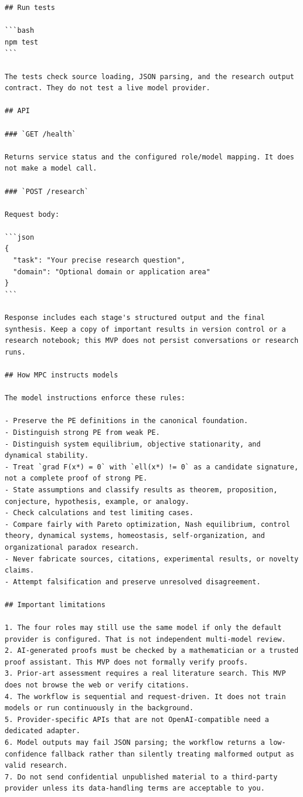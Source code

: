 \documentclass[10pt,a4paper]{article}
\begin{document}
\begin{lstlisting}
## Run tests

```bash
npm test
```

The tests check source loading, JSON parsing, and the research output contract. They do not test a live model provider.

## API

### `GET /health`

Returns service status and the configured role/model mapping. It does not make a model call.

### `POST /research`

Request body:

```json
{
  "task": "Your precise research question",
  "domain": "Optional domain or application area"
}
```

Response includes each stage's structured output and the final synthesis. Keep a copy of important results in version control or a research notebook; this MVP does not persist conversations or research runs.

## How MPC instructs models

The model instructions enforce these rules:

- Preserve the PE definitions in the canonical foundation.
- Distinguish strong PE from weak PE.
- Distinguish system equilibrium, objective stationarity, and dynamical stability.
- Treat `grad F(x*) = 0` with `ell(x*) != 0` as a candidate signature, not a complete proof of strong PE.
- State assumptions and classify results as theorem, proposition, conjecture, hypothesis, example, or analogy.
- Check calculations and test limiting cases.
- Compare fairly with Pareto optimization, Nash equilibrium, control theory, dynamical systems, homeostasis, self-organization, and organizational paradox research.
- Never fabricate sources, citations, experimental results, or novelty claims.
- Attempt falsification and preserve unresolved disagreement.

## Important limitations

1. The four roles may still use the same model if only the default provider is configured. That is not independent multi-model review.
2. AI-generated proofs must be checked by a mathematician or a trusted proof assistant. This MVP does not formally verify proofs.
3. Prior-art assessment requires a real literature search. This MVP does not browse the web or verify citations.
4. The workflow is sequential and request-driven. It does not train models or run continuously in the background.
5. Provider-specific APIs that are not OpenAI-compatible need a dedicated adapter.
6. Model outputs may fail JSON parsing; the workflow returns a low-confidence fallback rather than silently treating malformed output as valid research.
7. Do not send confidential unpublished material to a third-party provider unless its data-handling terms are acceptable to you.


\end{lstlisting}
\end{document}
